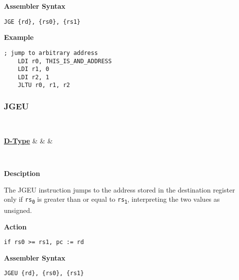 \vspace{3ex}

\textbf{Assembler Syntax}
\begin{lstlisting}[frame=single]
	JGE {rd}, {rs0}, {rs1}
\end{lstlisting}

\vspace{3ex}

\textbf{Example}
\begin{lstlisting}[frame=single]
	; jump to arbitrary address
	LDI r0, THIS_IS_AND_ADDRESS
	LDI r1, 0
	LDI r2, 1
	JLTU r0, r1, r2
\end{lstlisting}

\subsubsection{JGEU }\label{sec:JGEU}

\vspace{3ex}

\begin{center}
	\begin{bytefield}[leftcurly=., leftcurlyspace=0pt]{32}
		 \\
		\begin{leftwordgroup}{\hyperref[sec:r-type]{\textbf{D-Type}}}
		 & 
		 &
		 &
		\end{leftwordgroup}\\
	\end{bytefield}
\end{center}

\textbf{Desciption}

The JGEU instruction jumps to the address stored in the destination register only if \texttt{rs\textsubscript{0}} is greater than or equal to \texttt{rs\textsubscript{1}},
interpreting the two values as unsigned.

\vspace{3ex}

\textbf{Action}
\begin{lstlisting}[frame=single]
	if rs0 >= rs1, pc := rd
\end{lstlisting}

\vspace{3ex}

\textbf{Assembler Syntax}
\begin{lstlisting}[frame=single]
	JGEU {rd}, {rs0}, {rs1}
\end{lstlisting}

